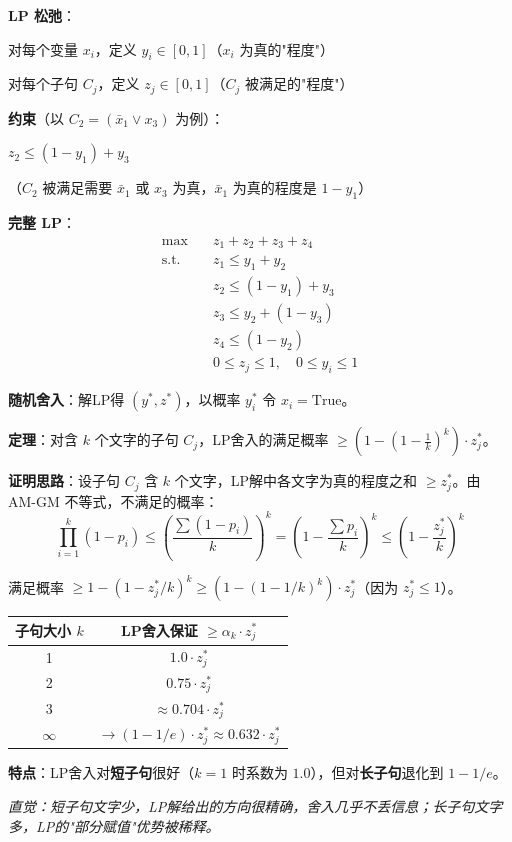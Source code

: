 \documentclass[12pt, a4paper]{ctexart}
\begin{document}
\begin{blackboard}[方法2：LP 随机舍入]

\textbf{LP 松弛}：

对每个变量 $x_i$，定义 $y_i \in [0, 1]$（$x_i$ 为真的"程度"）

对每个子句 $C_j$，定义 $z_j \in [0, 1]$（$C_j$ 被满足的"程度"）

\textbf{约束}（以 $C_2 = (\bar{x}_1 \vee x_3)$ 为例）：

$z_2 \leq (1 - y_1) + y_3$

（$C_2$ 被满足需要 $\bar{x}_1$ 或 $x_3$ 为真，$\bar{x}_1$ 为真的程度是 $1 - y_1$）

\textbf{完整 LP}：
\begin{align*}
\max \quad & z_1 + z_2 + z_3 + z_4 \\
\text{s.t.} \quad & z_1 \leq y_1 + y_2 \\
& z_2 \leq (1-y_1) + y_3 \\
& z_3 \leq y_2 + (1-y_3) \\
& z_4 \leq (1-y_2) \\
& 0 \leq z_j \leq 1, \quad 0 \leq y_i \leq 1
\end{align*}

\textbf{随机舍入}：解LP得 $(y^*, z^*)$，以概率 $y_i^*$ 令 $x_i = \text{True}$。

\end{blackboard}

\begin{blackboard}[LP 舍入的近似保证]

\textbf{定理}：对含 $k$ 个文字的子句 $C_j$，LP舍入的满足概率 $\geq (1 - (1-\frac{1}{k})^k) \cdot z_j^*$。

\textbf{证明思路}：设子句 $C_j$ 含 $k$ 个文字，LP解中各文字为真的程度之和 $\geq z_j^*$。由 AM-GM 不等式，不满足的概率：
\[
\prod_{i=1}^{k}(1-p_i) \leq \left(\frac{\sum(1-p_i)}{k}\right)^k = \left(1 - \frac{\sum p_i}{k}\right)^k \leq \left(1 - \frac{z_j^*}{k}\right)^k
\]

满足概率 $\geq 1 - (1 - z_j^*/k)^k \geq (1-(1-1/k)^k) \cdot z_j^*$（因为 $z_j^* \leq 1$）。

\begin{center}
\begin{tabular}{c|c}
子句大小 $k$ & LP舍入保证 $\geq \alpha_k \cdot z_j^*$ \\
\hline
1 & $1.0 \cdot z_j^*$ \\
2 & $0.75 \cdot z_j^*$ \\
3 & $\approx 0.704 \cdot z_j^*$ \\
$\infty$ & $\to (1-1/e) \cdot z_j^* \approx 0.632 \cdot z_j^*$
\end{tabular}
\end{center}

\textbf{特点}：LP舍入对\textbf{短子句}很好（$k=1$ 时系数为 $1.0$），但对\textbf{长子句}退化到 $1-1/e$。

\textit{直觉：短子句文字少，LP解给出的方向很精确，舍入几乎不丢信息；长子句文字多，LP的"部分赋值"优势被稀释。}

\end{blackboard}
\end{document}
